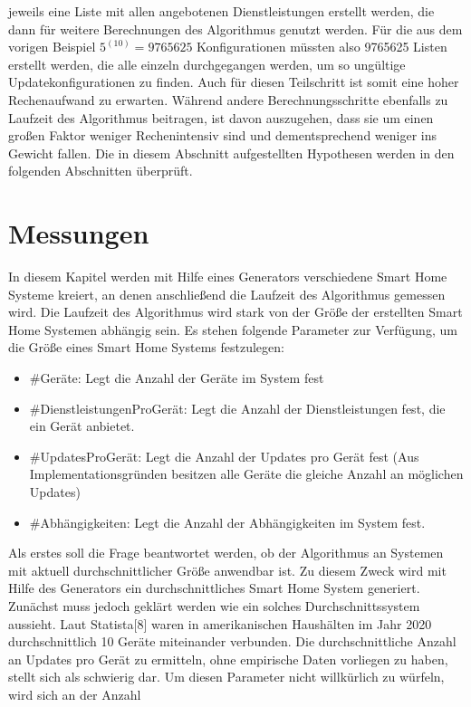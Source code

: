 jeweils eine Liste mit allen angebotenen Dienstleistungen erstellt werden, die dann für weitere Berechnungen des Algorithmus genutzt werden. 
Für die aus dem vorigen Beispiel \( 5^(10) = 9765625\) Konfigurationen müssten
also 9765625 Listen erstellt werden, die alle einzeln durchgegangen werden, um so ungültige Updatekonfigurationen zu finden. Auch für diesen Teilschritt 
ist somit eine hoher Rechenaufwand zu erwarten. Während andere
Berechnungsschritte ebenfalls zu Laufzeit des Algorithmus beitragen, ist davon auszugehen, dass sie um einen großen Faktor weniger
Rechenintensiv sind und dementsprechend weniger ins Gewicht fallen. Die in diesem Abschnitt aufgestellten Hypothesen werden in den folgenden Abschnitten
überprüft. 

\section{Messungen}
In diesem Kapitel werden mit Hilfe eines Generators verschiedene Smart Home Systeme kreiert, an denen anschließend die Laufzeit des Algorithmus gemessen wird. 
Die Laufzeit des Algorithmus wird stark von der Größe der erstellten Smart Home Systemen abhängig sein. Es stehen folgende Parameter zur Verfügung, um
die Größe eines Smart Home Systems festzulegen: 
\begin{itemize}
\item \#Geräte: Legt die Anzahl der Geräte im System fest
\item \#DienstleistungenProGerät: Legt die Anzahl der Dienstleistungen fest, die ein Gerät anbietet.
\item \#UpdatesProGerät: Legt die Anzahl der Updates pro Gerät fest (Aus Implementationsgründen besitzen alle Geräte die gleiche Anzahl an möglichen Updates)
\item \#Abhängigkeiten: Legt die Anzahl der Abhängigkeiten im System fest.
\end{itemize}
Als erstes soll die Frage beantwortet werden, ob der Algorithmus an Systemen mit aktuell durchschnittlicher Größe anwendbar ist.
Zu diesem Zweck wird mit Hilfe des Generators ein durchschnittliches Smart Home System generiert.
Zunächst muss jedoch geklärt werden wie ein solches Durchschnittssystem aussieht. Laut Statista[8] waren
in amerikanischen Haushälten im Jahr 2020 durchschnittlich 10 Geräte miteinander verbunden. Die durchschnittliche Anzahl an Updates pro Gerät zu
ermitteln, ohne empirische Daten vorliegen zu haben, stellt sich als schwierig dar. Um diesen Parameter nicht willkürlich zu würfeln, wird sich an der Anzahl
